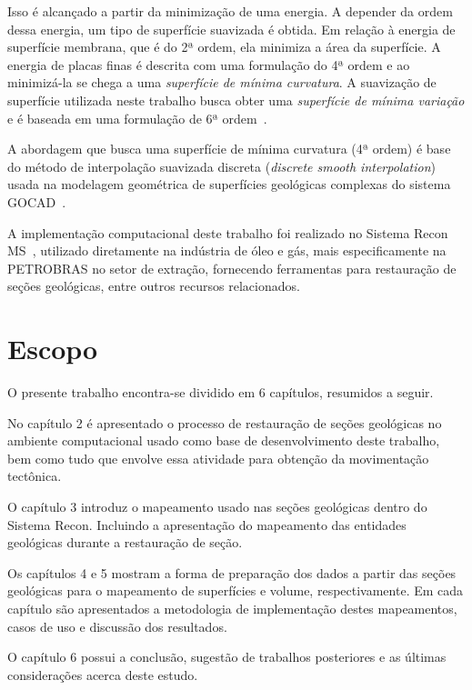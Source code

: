 Isso é alcançado a partir da minimização de uma energia. A depender da ordem dessa energia, um tipo de superfície suavizada é obtida. Em relação à energia de superfície membrana, que é do 2ª ordem, ela minimiza a área da superfície. A energia de placas finas é descrita com uma formulação do 4ª ordem e ao minimizá-la se chega a uma \emph{superfície de mínima curvatura}. A suavização de superfície utilizada neste trabalho busca obter uma \emph{superfície de mínima variação} e é baseada em uma formulação de 6ª ordem~\cite{Botsch}.

A abordagem que busca uma superfície de mínima curvatura (4ª ordem) é base do método de interpolação suavizada discreta (\emph{discrete smooth interpolation})~\cite{DSI} usada na modelagem geométrica de superfícies geológicas complexas do sistema GOCAD~\cite{GOCAD}.

A implementação computacional deste trabalho foi realizado no Sistema Recon MS~\cite{ReconTecgraf}, utilizado diretamente na indústria de óleo e gás, mais especificamente na PETROBRAS no setor de extração, fornecendo ferramentas para restauração de seções geológicas, entre outros recursos relacionados.

\section{Escopo}

O presente trabalho encontra-se dividido em 6 capítulos, resumidos a seguir.

No capítulo 2 é apresentado o processo de restauração de seções geológicas no ambiente computacional usado como base de desenvolvimento deste trabalho, bem como tudo que envolve essa atividade para obtenção da movimentação tectônica.

O capítulo 3 introduz o mapeamento usado nas seções geológicas dentro do Sistema Recon. Incluindo a apresentação do mapeamento das entidades geológicas durante a restauração de seção.

Os capítulos 4 e 5 mostram a forma de preparação dos dados a partir das seções geológicas para o mapeamento de superfícies e volume, respectivamente. Em cada capítulo são apresentados a metodologia de implementação destes mapeamentos, casos de uso e discussão dos resultados.

O capítulo 6 possui a conclusão, sugestão de trabalhos posteriores e as últimas considerações acerca deste estudo.